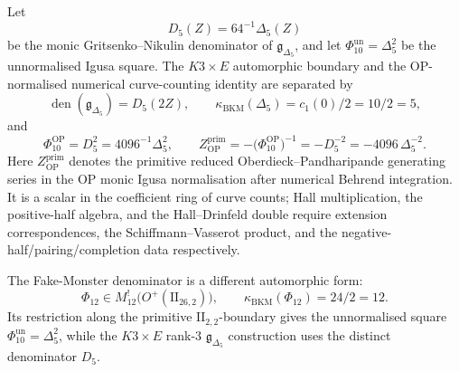 \begin{proposition}
\label{gluing:prop:delta5-phi10-phi12-op-separation}
Let
\[
 D_5(Z)=64^{-1}\Delta_5(Z)
\]
be the monic Gritsenko--Nikulin denominator of
\(\mathfrak g_{\Delta_5}\), and let
\(\Phi_{10}^{\mathrm{un}}=\Delta_5^2\) be the unnormalised Igusa
square. The \(K3\times E\) automorphic boundary and
the OP-normalised numerical curve-counting identity are separated by
\[
 \operatorname{den}(\mathfrak g_{\Delta_5})=D_5(2Z),
 \qquad
 \kappa_{\mathrm{BKM}}(\Delta_5)=
 c_1(0)/2=10/2=5,
\]
and
\[
 \Phi_{10}^{\mathrm{OP}}=D_5^2=4096^{-1}\Delta_5^2,\qquad
 Z_{\mathrm{OP}}^{\mathrm{prim}}
 =-\bigl(\Phi_{10}^{\mathrm{OP}}\bigr)^{-1}
 =-D_5^{-2}
 =-4096\,\Delta_5^{-2}.
\]
Here \(Z_{\mathrm{OP}}^{\mathrm{prim}}\) denotes the primitive reduced
Oberdieck--Pandharipande generating series in the OP monic Igusa
normalisation after numerical Behrend integration. It is a scalar in the coefficient ring of curve
counts; Hall multiplication, the positive-half algebra, and the
Hall--Drinfeld double require extension correspondences, the
Schiffmann--Vasserot product, and the negative-half/pairing/completion
data respectively.

The Fake-Monster denominator is a different automorphic form:
\[
 \Phi_{12}\in M^{!}_{12}\bigl(O^+(\mathrm{II}_{26,2})\bigr),
 \qquad
 \kappa_{\mathrm{BKM}}(\Phi_{12})=24/2=12.
\]
Its restriction along the primitive \(\mathrm{II}_{2,2}\)-boundary
gives the unnormalised square \(\Phi_{10}^{\mathrm{un}}=\Delta_5^2\),
while the \(K3\times E\)
rank-\(3\) \(\mathfrak g_{\Delta_5}\) construction uses the distinct
denominator \(D_5\).
\end{proposition}

